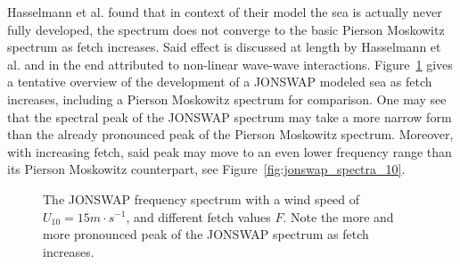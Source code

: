 Hasselmann et al. found that in context of their model the sea is actually 
never fully developed, the  spectrum does not converge to the basic Pierson 
Moskowitz spectrum as fetch increases. Said effect is discussed at 
length by Hasselmann et al. and in the end attributed to non-linear wave-wave 
interactions. Figure~\ref{fig:jonswap_spectra_15} gives a tentative 
overview of the development of a JONSWAP modeled sea as fetch increases, 
including a Pierson Moskowitz spectrum for comparison. One may see that the 
spectral peak of the JONSWAP spectrum may take a more narrow form than the 
already pronounced peak of the Pierson Moskowitz spectrum. Moreover, with 
increasing fetch, said peak may move to an even lower frequency range than its 
Pierson Moskowitz counterpart, see Figure~\ref{fig:jonswap_spectra_10}.
%
\begin{figure}
\centering
{}
\caption{The JONSWAP frequency spectrum with a wind speed of $U_{10} = 15m\cdot 
s^{-1}$, and different fetch values $F$. Note the more and more pronounced peak 
of the JONSWAP spectrum as fetch increases. }
\label{fig:jonswap_spectra_15}
\end{figure}
%

